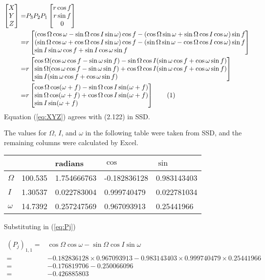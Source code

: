 \documentclass[]{article}
\newcommand\numberthis{\addtocounter{equation}{1}\tag{\theequation}}
\begin{document}
\begin{align*}
\begin{bmatrix*}[c]
X\\
Y\\
Z
\end{bmatrix*}
=&P_3 P_2 P_1\begin{bmatrix*}[c]
r \cos f\\
r \sin f\\
0
\end{bmatrix*}\\
=&r \begin{bmatrix*}[l]
(\cos \Omega \cos \omega - \sin \Omega \cos I \sin \omega) \cos f -(\cos \Omega \sin \omega + \sin \Omega \cos I \cos \omega) \sin f\\
(\sin \Omega \cos \omega + \cos \Omega \cos I \sin \omega) \cos f - (\sin \Omega \sin \omega - \cos \Omega \cos I \cos \omega) \sin f\\
\sin I \sin \omega \cos f + \sin I \cos \omega \sin f
\end{bmatrix*}\\
=&r \begin{bmatrix*}[l]
\cos \Omega (\cos \omega \cos f-\sin \omega \sin f) -\sin\Omega \cos I (\sin \omega \cos f + \cos \omega \sin f)\\
\sin \Omega (\cos \omega \cos f - \sin \omega \sin f) + \cos\Omega \cos I (\sin \omega \cos f + \cos \omega \sin f) \\
\sin I (\sin \omega \cos f + \cos \omega \sin f)
\end{bmatrix*}\\
=&r \begin{bmatrix*}[l]
\cos \Omega \cos (\omega + f) - \sin \Omega \cos I \sin(\omega + f)\\
\sin \Omega \cos (\omega + f) + \cos \Omega \cos I \sin (\omega + f)\\
\sin I \sin (\omega + f)
\end{bmatrix*} \numberthis \label{eq:XYZ}
\end{align*}
Equation (\ref{eq:XYZ}) agrees with (2.122) in SSD.

The values for $\Omega$, $I$, and $\omega$ in the following table were taken from SSD, and the remaining columns were calculated by Excel.
\begin{center}
	\begin{tabular}{|l|l|l|l|l|}
		\hline
		&&	radians&$\cos$&$\sin$\\ \hline
		$\Omega$&100.535\degree	&1.754666763&	-0.182836128&	0.983143403\\ \hline
		$I$&1.30537\degree&	0.022783004&	0.999740479&	0.022781034\\ \hline
		$\omega$&14.7392\degree&	0.257247569&	0.967093913&	0.25441966\\ \hline
	\end{tabular}
\end{center}

Substituting in (\ref{eq:Pj})

\begin{align*}
(P_j)_{1,1} =& \cos \Omega \cos \omega - \sin \Omega \cos I \sin \omega \\
=& -0.182836128 \times 	0.967093913 - 0.983143403 \times 0.999740479 \times 	0.25441966\\
=& -0.176819706 - 0.250066096\\
=& -0.426885803
\end{align*}
\end{document}
